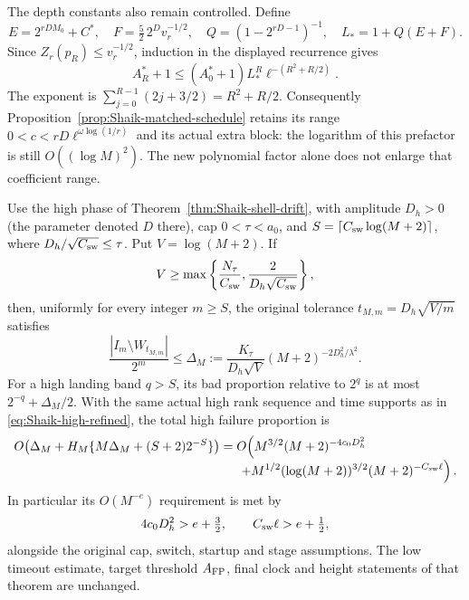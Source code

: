 The depth constants also remain controlled. Define
\[
 E=2^{rDM_0}+C^*,\quad F=\tfrac52\,2^D v_r^{-1/2},\quad
 Q=(1-2^{rD-1})^{-1},\quad L_*=1+Q(E+F).
\]
Since \(Z_r(p_R)\le v_r^{-1/2}\), induction in the displayed recurrence
gives
\[
 A_R^*+1\le(A_0^*+1)L_*^R\ell^{-(R^2+R/2)}.
\]
The exponent is \(\sum_{j=0}^{R-1}(2j+3/2)=R^2+R/2\).
Consequently Proposition~\ref{prop:Shaik-matched-schedule} retains
its range \(0<c<rD\ell^{\omega\log(1/r)}\) and its actual extra block:
the logarithm of this prefactor is still \(O((\log M)^2)\).
The new polynomial factor alone does not enlarge that coefficient range.

\begin{corollary}
\label{cor:Shaik-shrinking-prefactor}
Use the high phase of Theorem~\ref{thm:Shaik-shell-drift}, with
amplitude \(D_h>0\) (the parameter denoted \(D\) there),
cap \(0<\tau<a_0\), and
\(S=\lceil C_{\rm sw}\log(M+2)\rceil\), where
\(D_h/\sqrt{C_{\rm sw}}\le\tau\).
Put \(V=\log(M+2)\). If
\[
 V\ge\max\left\{\frac{N_\tau}{C_{\rm sw}},
                      \frac{2}{D_h\sqrt{C_{\rm sw}}}\right\},
\]
then, uniformly for every integer \(m\ge S\), the original tolerance
\(t_{M,m}=D_h\sqrt{V/m}\) satisfies
\begin{equation}\label{eq:Shaik-shrinking-prefactor}
 \frac{|I_m\setminus W_{t_{M,m}}|}{2^m}
 \le \Delta_M:=
 \frac{K_\tau}{D_h\sqrt V}(M+2)^{-2D_h^2/\lambda^2}.
\end{equation}
For a high landing band \(q>S\), its bad proportion relative to
\(2^q\) is at most \(2^{-q}+\Delta_M/2\).
With the same actual high rank sequence and time supports as in
\eqref{eq:Shaik-high-refined}, the total high failure proportion is
\begin{align}
 O\!\left(\Delta_M+
 H_M\{M\Delta_M+(S+2)2^{-S}\}\right)
 &=O\!\left(
 M^{3/2}(M+2)^{-4c_0D_h^2}
 \right.\nonumber\\[-1mm]
 &\hspace{5mm}\left.+
 M^{1/2}(\log(M+2))^{3/2}
                   (M+2)^{-C_{\rm sw}\ell}\right).
 \label{eq:Shaik-shrinking-high-charge}
\end{align}
In particular its \(O(M^{-e})\) requirement is met by
\[
 4c_0D_h^2>e+\tfrac32,\qquad C_{\rm sw}\ell>e+\tfrac12,
\]
alongside the original cap, switch, startup and stage assumptions.
The low timeout estimate, target threshold \(A_{\rm FP}\), final
clock and height statements of that theorem are unchanged.
\end{corollary}
